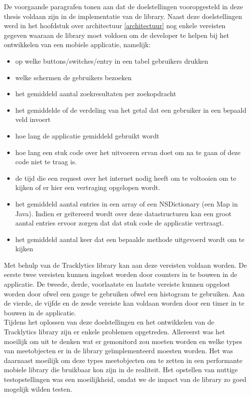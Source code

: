 De voorgaande paragrafen tonen aan dat de doelstellingen vooropgesteld in deze thesis voldaan zijn in de implementatie van de library. Naast deze doelstellingen werd in het hoofdstuk over architectuur \ref{architectuur} nog enkele vereisten gegeven waaraan de library moet voldoen om de developer te helpen bij het ontwikkelen van een mobiele applicatie, namelijk: 
\begin{itemize}
\item op welke buttons/switches/entry in een tabel gebruikers drukken
\item welke schermen de gebruikers bezoeken
\item het gemiddeld aantal zoekresultaten per zoekopdracht
\item het gemiddelde of de verdeling van het getal dat een gebruiker in een bepaald veld invoert
\item hoe lang de applicatie gemiddeld gebruikt wordt
\item hoe lang een stuk code over het uitvoeren ervan doet om na te gaan of deze code niet te traag is.
\item de tijd die een request over het internet nodig heeft om te voltooien om te kijken of er hier een vertraging opgelopen wordt.
\item het gemiddeld aantal entries in een array of een NSDictionary (een Map in Java). Indien er ge\"itereerd wordt over deze datastructuren kan een groot aantal entries ervoor zorgen dat dat stuk code de applicatie vertraagt.
\item het gemiddeld aantal keer dat een bepaalde methode uitgevoerd wordt om te kijken
\end{itemize}

Met behulp van de Tracklytics library kan aan deze vereisten voldaan worden. De eerste twee vereisten kunnen ingelost worden door counters in te bouwen in de applicatie. De tweede, derde, voorlaatste en laatste vereiste kunnen opgelost worden door ofwel een gauge te gebruiken ofwel een histogram te gebruiken. Aan de vierde, de vijfde en de zesde vereiste kan voldaan worden door een timer in te bouwen in de applicatie.\\

Tijdens het oplossen van deze doelstellingen en het ontwikkelen van de Tracklytics library zijn er enkele problemen opgetreden. Allereerst was het moeilijk om uit te denken wat er gemonitord zou moeten worden en welke types van meetobjecten er in de library ge\"implementeerd moesten worden. Het was daarnaast moeilijk om deze types meetobjecten om te zetten in een performante mobiele library die bruikbaar kon zijn in de realiteit. Het opstellen van nuttige testopstellingen was een moeilijkheid, omdat we de impact van de library zo goed mogelijk wilden testen.\\

